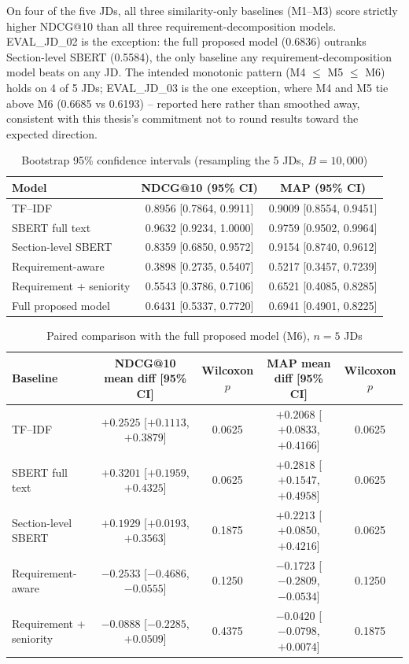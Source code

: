 \documentclass[12pt,a4paper,oneside]{report}
\begin{document}
On four of the five JDs, all three similarity-only baselines (M1--M3) score strictly higher NDCG@10 than all three requirement-decomposition models. EVAL\_JD\_02 is the exception: the full proposed model (0.6836) outranks Section-level SBERT (0.5584), the only baseline any requirement-decomposition model beats on any JD. The intended monotonic pattern (M4 $\le$ M5 $\le$ M6) holds on 4 of 5 JDs; EVAL\_JD\_03 is the one exception, where M4 and M5 tie above M6 (0.6685 vs 0.6193) -- reported here rather than smoothed away, consistent with this thesis's commitment not to round results toward the expected direction.

\begin{table}[htbp]
\centering
\caption{Bootstrap 95\% confidence intervals (resampling the 5 JDs, $B{=}10{,}000$)}
\label{tab:bootstrap-ci}
\begin{tabular}{lcc}
\toprule
Model & NDCG@10 (95\% CI) & MAP (95\% CI) \\
\midrule
TF--IDF & 0.8956 [0.7864, 0.9911] & 0.9009 [0.8554, 0.9451] \\
SBERT full text & 0.9632 [0.9234, 1.0000] & 0.9759 [0.9502, 0.9964] \\
Section-level SBERT & 0.8359 [0.6850, 0.9572] & 0.9154 [0.8740, 0.9612] \\
Requirement-aware & 0.3898 [0.2735, 0.5407] & 0.5217 [0.3457, 0.7239] \\
Requirement + seniority & 0.5543 [0.3786, 0.7106] & 0.6521 [0.4085, 0.8285] \\
Full proposed model & 0.6431 [0.5337, 0.7720] & 0.6941 [0.4901, 0.8225] \\
\bottomrule
\end{tabular}
\end{table}

\begin{table}[htbp]
\centering
\caption{Paired comparison with the full proposed model (M6), $n{=}5$ JDs}
\label{tab:paired-significance}
\begin{tabular}{lcccc}
\toprule
Baseline & NDCG@10 mean diff [95\% CI] & Wilcoxon $p$ & MAP mean diff [95\% CI] & Wilcoxon $p$ \\
\midrule
TF--IDF & $+0.2525$ [$+0.1113$, $+0.3879$] & 0.0625 & $+0.2068$ [$+0.0833$, $+0.4166$] & 0.0625 \\
SBERT full text & $+0.3201$ [$+0.1959$, $+0.4325$] & 0.0625 & $+0.2818$ [$+0.1547$, $+0.4958$] & 0.0625 \\
Section-level SBERT & $+0.1929$ [$+0.0193$, $+0.3563$] & 0.1875 & $+0.2213$ [$+0.0850$, $+0.4216$] & 0.0625 \\
Requirement-aware & $-0.2533$ [$-0.4686$, $-0.0555$] & 0.1250 & $-0.1723$ [$-0.2809$, $-0.0534$] & 0.1250 \\
Requirement + seniority & $-0.0888$ [$-0.2285$, $+0.0509$] & 0.4375 & $-0.0420$ [$-0.0798$, $+0.0074$] & 0.1875 \\
\bottomrule
\end{tabular}
\end{table}
\end{document}

